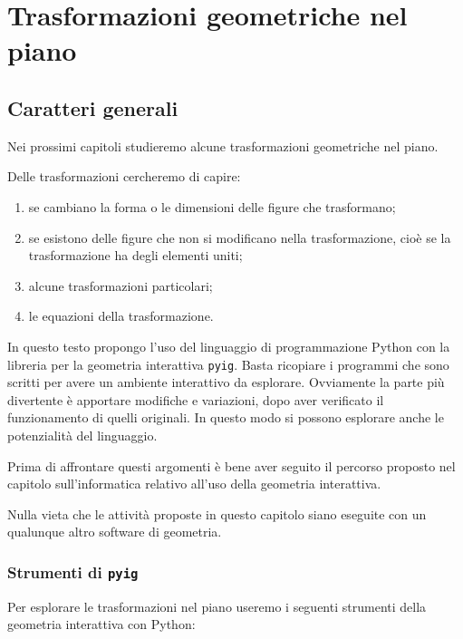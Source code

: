 
\chapter{Trasformazioni geometriche nel piano}

\section{Caratteri generali}
\label{sec:caratterigenerali}

Nei prossimi capitoli studieremo alcune trasformazioni geometriche nel piano.

Delle trasformazioni cercheremo di capire:
\begin{enumerate} [noitemsep]
\item se cambiano la forma o le dimensioni delle figure che trasformano;
\item se esistono delle figure che non si modificano nella trasformazione,
 cioè se la trasformazione ha degli elementi uniti;
\item alcune trasformazioni particolari;
\item le equazioni della trasformazione.
\end{enumerate}

In questo testo propongo l'uso del linguaggio di programmazione Python con 
la libreria per la geometria interattiva \texttt{pyig}. 
Basta ricopiare i programmi che sono scritti per 
avere un ambiente interattivo da esplorare. 
Ovviamente la parte più divertente è apportare modifiche e variazioni, 
dopo aver verificato il funzionamento di quelli originali. 
In questo modo si possono esplorare anche le potenzialità del linguaggio.

Prima di affrontare questi argomenti è bene aver seguito il percorso proposto 
nel capitolo sull'informatica relativo all'uso della geometria interattiva.

Nulla vieta che le attività proposte in questo capitolo siano eseguite con 
un qualunque altro software di geometria.

\subsection{Strumenti di \texttt{pyig}}

Per esplorare le trasformazioni nel piano useremo i seguenti strumenti della
geometria interattiva con Python:

